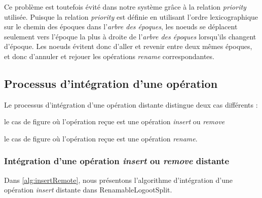 \documentclass[12pt]{thesul}
\begin{document}
Ce problème est toutefois évité dans notre système grâce à la relation \emph{priority} utilisée.
Puisque la relation \emph{priority} est définie en utilisant l'ordre lexicographique sur le chemin des époques dans l'\emph{arbre des époques}, les noeuds se déplacent seulement vers l'époque la plus à droite de l'\emph{arbre des époques} lorsqu'ils changent d'époque.
Les noeuds évitent donc d'aller et revenir entre deux mêmes époques, et donc d'annuler et rejouer les opérations \emph{rename} correspondantes.

\subsection{Processus d'intégration d'une opération}

Le processus d'intégration d'une opération distante distingue deux cas différents :
\begin{enumerate*}[label=(\roman*)]
  \item le cas de figure où l'opération reçue est une opération \emph{insert} ou \emph{remove}
  \item le cas de figure où l'opération reçue est une opération \emph{rename}.
\end{enumerate*}

\subsubsection{Intégration d'une opération \emph{insert} ou \emph{remove} distante}

Dans \autoref{alg:insertRemote}, nous présentons l'algorithme d'intégration d'une opération \emph{insert} distante dans RenamableLogootSplit.
\end{document}
